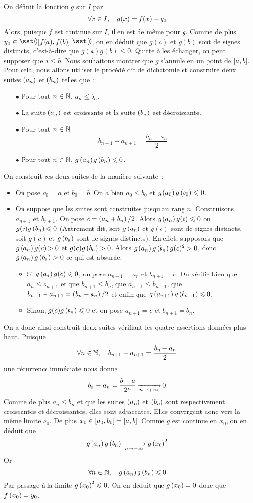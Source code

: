 \documentclass{magnolia}
\begin{document}
\begin{preuve}
On définit la fonction $g$ sur $I$ par
\[\forall x\in I ,\quad g(x)=f(x)-y_0\]
Alors, puisque $f$ est continue sur $I$, il en est de même pour $g$. Comme
de plus $y_0\in\intergf{f(a)}{f(b)}$, on en déduit que $g(a)$ et
$g(b)$ sont de signes distincts, c'est-à-dire que $g(a)g(b)\leq 0$.
Quitte à les échanger, on peut supposer que $a\leq b$. Nous souhaitons
montrer que $g$ s'annule en un point de $\left[a,b\right]$. Pour cela, nous
allons utiliser le procédé dit de dichotomie et construire deux suites
$\left(a_n\right)$ et $\left(b_n\right)$ telles que~:
\begin{itemize}
\item[$\bullet$] Pour tout $n\in\mathbb{N}$, $a_n\leq b_n$.
\item[$\bullet$] La suite $\left(a_n\right)$ est croissante et la suite $\left(b_n\right)$ est décroissante.
\item[$\bullet$] Pour tout $n\in\mathbb{N}$
  \[b_{n+1}-a_{n+1}=\frac{b_n-a_n}{2}\]
\item[$\bullet$] Pour tout $n\in\mathbb{N}$, $g\left(a_n\right)g\left(b_n\right)\leqslant 0$.
\end{itemize}
On construit ces deux suites de la manière suivante~:
\begin{itemize}
\item On pose $a_0=a$ et $b_0=b$. On a bien $a_0\leq b_0$ et
  $g\left(a_0\right)g\left(b_0\right)\leqslant 0$.
\item On suppose que les suites sont construites jusqu'au rang $n$. Construisons
  $a_{n+1}$ et $b_{n+1}$. On pose $c=\left(a_n+b_n\right)/2$. Alors
  $g\left(a_n\right)g(c)\leqslant 0$ ou $g(c)g\left(b_n\right)\leqslant 0$ (Autrement dit, soit
  $g\left(a_n\right)$ et $g(c)$ sont de signes distincts, soit $g(c)$ et $g\left(b_n\right)$
  sont de signes distincts). En effet, supposons que
  $g\left(a_n\right)g(c)> 0$ et $g(c)g\left(b_n\right)> 0$. Alors
  $g\left(a_n\right)g\left(b_n\right)g(c)^2>0$, donc $g\left(a_n\right)g\left(b_n\right)>0$ ce qui est absurde.
  \begin{itemize}
  \item Si $g\left(a_n\right)g(c)\leqslant 0$, on pose $a_{n+1}=a_n$ et $b_{n+1}=c$.
    On vérifie bien que $a_n\leq a_{n+1}$ et que $b_{n+1}\leq b_n$, que
    $a_{n+1}\leq b_{n+1}$, que $b_{n+1}-a_{n+1}=\left(b_n-a_n\right)/2$ et enfin
    que $g\left(a_{n+1}\right)g\left(b_{n+1}\right)\leqslant 0$.
  \item Sinon, $g(c)g\left(b_n\right)\leqslant 0$ et on pose $a_{n+1}=c$ et $b_{n+1}=b_n$.
  \end{itemize}
\end{itemize}
On a donc ainsi construit deux suites vérifiant les quatre assertions données
plus haut. Puisque
\[\forall n\in\mathbb{N} ,\quad b_{n+1}-a_{n+1}=\frac{b_n-a_n}{2}\]
une récurrence immédiate nous donne
\[b_n-a_n=\frac{b-a}{2^n}\xrightarrow[n\rightarrow +\infty]{} 0\]
Comme de plus $a_n\leq b_n$ et que les suites $\left(a_n\right)$ et $\left(b_n\right)$ sont
respectivement croissantes et décroissantes, elles sont adjacentes.
Elles convergent donc
vers la même limite $x_0$. De plus $x_0\in\left[a_0,b_0\right]=\left[a,b\right]$.
Comme $g$ est continue en $x_0$, on en déduit que
\[g\left(a_n\right)g\left(b_n\right)\xrightarrow[n\rightarrow +\infty]{} g\left(x_0\right)^2\]
Or
\[\forall n\in\mathbb{N} ,\quad g\left(a_n\right)g\left(b_n\right)\leqslant 0\]
Par passage à la limite $g\left(x_0\right)^2\leqslant 0$. On en déduit que $g\left(x_0\right)=0$
donc que $f\left(x_0\right)=y_0$.
\end{preuve}
\end{document}

